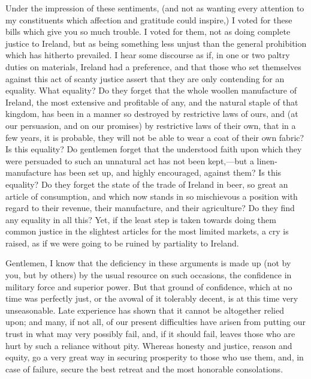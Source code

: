 Under the impression of these sentiments, (and not as wanting every attention to my constituents which affection and gratitude could inspire,) I voted for these bills which give you so much trouble. I voted for them, not as doing complete justice to Ireland, but as being something less unjust than the general prohibition which has hitherto prevailed. I hear some discourse as if, in one or two paltry duties on materials, Ireland had a preference, and that those who set themselves against this act of scanty justice assert that they are only contending for an equality. What equality? Do they forget that the whole woollen manufacture of Ireland, the most extensive and profitable of any, and the natural staple of that kingdom, has been in a manner so destroyed by restrictive laws of ours, and (at our persuasion, and on our promises) by restrictive laws of their own, that in a few years, it is probable, they will not be able to wear a coat of their own fabric? Is this equality? Do gentlemen forget that the understood faith upon which they were persuaded to such an unnatural act has not been kept,—but a linen-manufacture has been set up, and highly encouraged, against them? Is this equality? Do they forget the state of the trade of Ireland in beer, so great an article of consumption, and which now stands in so mischievous a position with regard to their revenue, their manufacture, and their agriculture? Do they find any equality in all this? Yet, if the least step is taken towards doing them common justice in the slightest articles for the most limited markets, a cry is raised, as if we were going to be ruined by partiality to Ireland.

Gentlemen, I know that the deficiency in these arguments is made up (not by you, but by others) by the usual resource on such occasions, the confidence in military force and superior power. But that ground of confidence, which at no time was perfectly just, or the avowal of it tolerably decent, is at this time very unseasonable. Late experience has shown that it cannot be altogether relied upon; and many, if not all, of our present difficulties have arisen from putting our trust in what may very possibly fail, and, if it should fail, leaves those who are hurt by such a reliance without pity. Whereas honesty and justice, reason and equity, go a very great way in securing prosperity to those who use them, and, in case of failure, secure the best retreat and the most honorable consolations.

